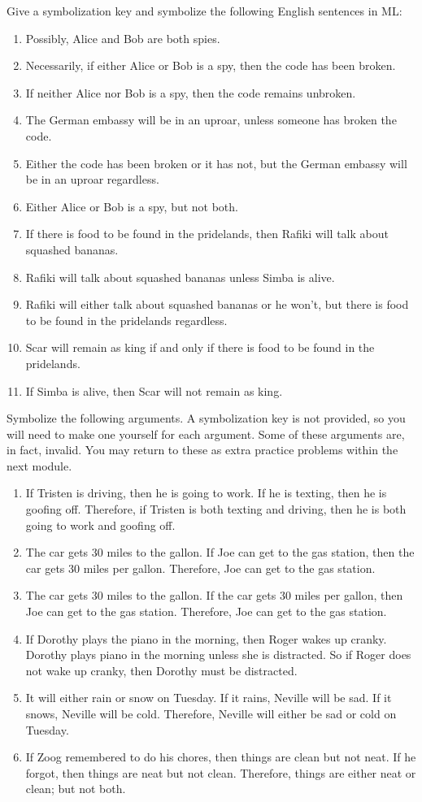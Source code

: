 \problempart
Give a symbolization key and symbolize the following English sentences in ML:
\begin{enumerate}
\item Possibly, Alice and Bob are both spies.
\item Necessarily, if either Alice or Bob is a spy, then the code has been broken.
\item If neither Alice nor Bob is a spy, then the code remains unbroken.
\item The German embassy will be in an uproar, unless someone has broken the code.
\item Either the code has been broken or it has not, but the German embassy will be in an uproar regardless.
\item Either Alice or Bob is a spy, but not both.
\item If there is food to be found in the pridelands, then Rafiki will talk about squashed bananas.
\item Rafiki will talk about squashed bananas unless Simba is alive.
\item Rafiki will either talk about squashed bananas or he won't, but there is food to be found in the pridelands regardless.
\item Scar will remain as king if and only if there is food to be found in the pridelands.
\item If Simba is alive, then Scar will not remain as king.
\end{enumerate}

\problempart
Symbolize the following arguments. A symbolization key is not provided, so you will need to make one yourself for each argument. Some of these arguments are, in fact, invalid. You may return to these as extra practice problems within the next module.
\begin{enumerate}
\item If Tristen is driving, then he is going to work. If he is texting, then he is goofing off. Therefore, if Tristen is both texting and driving, then he is both going to work and goofing off.
\item The car gets 30 miles to the gallon. If Joe can get to the gas station, then the car gets 30 miles per gallon. Therefore, Joe can get to the gas station.
\item The car gets 30 miles to the gallon. If the car gets 30 miles per gallon, then Joe can get to the gas station. Therefore, Joe can get to the gas station.
\item If Dorothy plays the piano in the morning, then Roger wakes up cranky. Dorothy plays piano in the morning unless she is distracted. So if Roger does not wake up cranky, then Dorothy must be distracted.
\item It will either rain or snow on Tuesday. If it rains, Neville will be sad. If it snows, Neville will be cold. Therefore, Neville will either be sad or cold on Tuesday.
\item If Zoog remembered to do his chores, then things are clean but not neat. If he forgot, then things are neat but not clean. Therefore, things are either neat or clean; but not both.
\end{enumerate}


